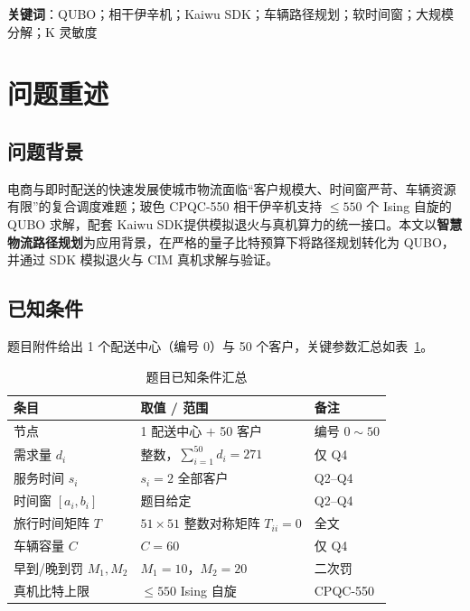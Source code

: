 \documentclass[UTF8,12pt,a4paper]{ctexart}
\begin{document}
\vspace{0.3em}
\noindent\textbf{关键词}：QUBO；相干伊辛机；Kaiwu SDK；车辆路径规划；软时间窗；大规模分解；K 灵敏度

\newpage

\section{问题重述}

\subsection{问题背景}

电商与即时配送的快速发展使城市物流面临``客户规模大、时间窗严苛、车辆资源有限''的复合调度难题；玻色 CPQC-550 相干伊辛机\cite{boson2024cpqc,yamamoto2017cim,honjo2021cim2000}支持 $\le 550$ 个 Ising 自旋的 QUBO 求解，配套 Kaiwu SDK\cite{kaiwusdk2024}提供模拟退火与真机算力的统一接口。本文以\textbf{智慧物流路径规划}为应用背景，在严格的量子比特预算下将路径规划转化为 QUBO，并通过 SDK 模拟退火与 CIM 真机求解与验证。

\subsection{已知条件}

题目附件给出 1 个配送中心（编号 0）与 50 个客户，关键参数汇总如表~\ref{tab:given}。

\begin{table}[H]
    \centering\footnotesize
    \caption{题目已知条件汇总}
    \label{tab:given}
    \begin{tabular}{l l l}
        \toprule
        条目 & 取值 / 范围 & 备注 \\
        \midrule
        节点 & 1 配送中心 $+$ 50 客户 & 编号 $0\sim50$ \\
        需求量 $d_i$ & 整数，$\sum_{i=1}^{50}d_i=271$ & 仅 Q4 \\
        服务时间 $s_i$ & $s_i=2$ 全部客户 & Q2--Q4 \\
        时间窗 $[a_i,b_i]$ & 题目给定 & Q2--Q4 \\
        旅行时间矩阵 $T$ & $51\!\times\!51$ 整数对称矩阵 $T_{ii}=0$ & 全文 \\
        车辆容量 $C$ & $C=60$ & 仅 Q4 \\
        早到/晚到罚 $M_1,M_2$ & $M_1=10$，$M_2=20$ & 二次罚 \\
        真机比特上限 & $\le 550$ Ising 自旋 & CPQC-550 \\
        \bottomrule
    \end{tabular}
\end{table}
\end{document}
